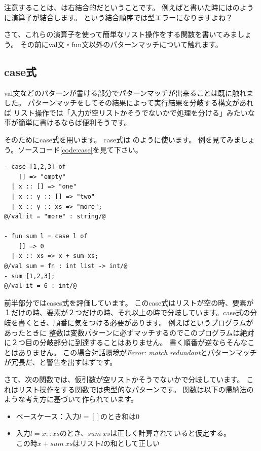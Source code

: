 \documentclass[11pt,a4paper]{article}
\begin{document}
注意することは、\prog{::}は右結合的だということです。
例えばと書いた時にはのように演算子が結合します。
という結合順序では型エラーになりますよね？

さて、これらの演算子を使って簡単なリスト操作をする関数を書いてみましょう。
その前にval文・fun文以外のパターンマッチについて触れます。

\subsection{case式}

val文などのパターンが書ける部分でパターンマッチが出来ることは既に触れました。
パターンマッチをしてその結果によって実行結果を分岐する構文があれば
リスト操作では「入力が空リストかそうでないかで処理を分ける」みたいな事が簡単に書けるならば便利そうです。

そのためにcase式を用います。
case式は
のように使います。
例を見てみましょう。ソースコード\ref{code:case}を見て下さい。

\begin{lstlisting}[caption=case式,label=code:case]
- case [1,2,3] of
    [] => "empty"
  | x :: [] => "one"
  | x :: y :: [] => "two"
  | x :: y :: xs => "more";
@/val it = "more" : string/@

- fun sum l = case l of
    [] => 0
  | x :: xs => x + sum xs;
@/val sum = fn : int list -> int/@
- sum [1,2,3];
@/val it = 6 : int/@
\end{lstlisting}

前半部分ではcases式を評価しています。
このcase式はリストが空の時、要素が１だけの時、要素が２つだけの時、それ以上の時で分岐しています。case式の分岐を書くとき、順番に気をつける必要があります。
例えばというプログラムがあったときに
整数は変数パターンに必ずマッチするのでこのプログラムは絶対に２つ目の分岐部分に到達することはありません。
書く順番が逆ならそんなことはありません。
この場合対話環境が\textit{Error: match redundant}とパターンマッチが冗長だ、と警告を出すはずです。

さて、次の関数では、仮引数が空リストかそうでないかで分岐しています。
これはリスト操作をする関数では典型的なパターンです。
関数は以下の帰納法のような考え方に基づいて作られています。
\begin{itemize}
\item ベースケース：入力$l = []$のとき和は0
\item 入力$l = x :: xs$のとき、$sum \ xs$は正しく計算されていると仮定する。\\
  この時$x + sum \ xs$はリスト$l$の和として正しい
\end{itemize}
\end{document}

